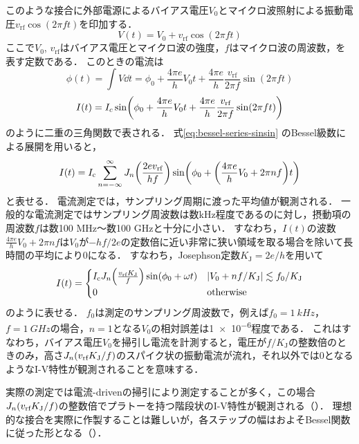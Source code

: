 \documentclass[dvipdfmx,autodetect-engine,12pt,fleqn]{jsarticle}
\begin{document}
このような接合に外部電源によるバイアス電圧$V_0$とマイクロ波照射による振動電圧$v_{\text{rf}}\cos(2\pi ft)$を印加する．
\begin{equation}
    V(t)=V_0+v_{\text{rf}}\cos(2\pi ft)
\end{equation}
ここで$V_0$, $v_{\text{rf}}$はバイアス電圧とマイクロ波の強度，$f$はマイクロ波の周波数，を表す定数である．
このときの電流は
\begin{equation}
    \phi(t) = \int V\dd t = \phi_0 + \frac{4\pi e}{h}V_0 t+\frac{4\pi e}{h}\frac{v_{\text{rf}}}{2\pi f}\sin(2\pi ft)
\end{equation}
\begin{equation}
    I(t) = I_c\sin\rbra*{\phi_0 + \frac{4\pi e}{h}V_0 t+\frac{4\pi e}{h}\frac{v_{\text{rf}}}{2\pi f}\sin(2\pi ft)}
\end{equation}
のように二重の三角関数で表される．
式\eqref{eq:bessel-series-sinsin} のBessel級数による展開を用いると，
\begin{equation}
    I(t) = I_{\text{c}}\sum_{n=-\infty}^\infty J_n\rbra*{\frac{2e v_{\text{rf}}}{hf}}
    \sin\rbra*{\phi_0 + \qty(\frac{4\pi e}{h}V_0 + 2\pi n f) t}
\end{equation}
と表せる．
電流測定では，サンプリング周期に渡った平均値が観測される．
一般的な電流測定ではサンプリング周波数は数\si{kHz}程度であるのに対し，摂動項の周波数$f$は数100 \si{MHz}～数100 \si{GHz}と十分に小さい．
すなわち，$I(t)$の波数$\frac{4\pi e}{h}V_0 + 2\pi n f$は$V_0$が$-hf/2e$の定数倍に近い非常に狭い領域を取る場合を除いて長時間の平均により0になる．
すなわち，Josephson定数$K_{\text{J}}=2e/h$を用いて
\begin{equation}
    I(t)=\begin{cases}
        I_{\text{c}} J_n\rbra*{\frac{ v_{\text{rf}}K_{\text{J}}}{f}}\sin(\phi_0+\omega t) & \abs{V_0+nf/K_{\text{J}}}\lesssim f_0/K_{\text{J}}\\
        0 & \text{otherwise}
    \end{cases}
\end{equation}
のように表せる．
$f_0$は測定のサンプリング周波数で，例えば$f_0=\SI{1}{kHz}$，$f=\SI{1}{GHz}$の場合，$n=1$となる$V_0$の相対誤差は\num{1e-6}程度である．
これはすなわち，バイアス電圧$V_0$を掃引し電流を計測すると，電圧が$f/K_{\text{J}}$の整数倍のときのみ，高さ$J_n\lparen{v_{\text{rf}}}K_{\text{J}}/{f}\rparen$のスパイク状の振動電流が流れ，それ以外では0となるようなI-V特性が観測されることを意味する．

実際の測定では電流-drivenの掃引により測定することが多く，この場合$J_n\lparen{v_{\text{rf}}}K_{\text{J}}/{f}\rparen$の整数倍でプラトーを持つ階段状のI-V特性が観測される（）．
理想的な接合を実際に作製することは難しいが，各ステップの幅はおよそBessel関数に従った形となる（）．
\end{document}
